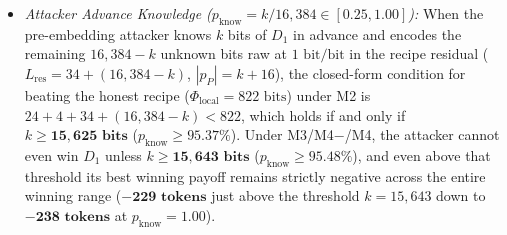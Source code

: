\documentclass[runningheads,a4paper]{llncs}
\renewcommand{\_}{\textunderscore\allowbreak}
\begin{document}
\begin{itemize}
  \item \emph{Attacker Advance Knowledge ($p_{\text{know}} = k / 16,384 \in [0.25,\allowbreak 1.00]$):} When the pre-embedding attacker knows $k$ bits of $D_1$ in advance and encodes the remaining $16,384 - k$ unknown bits raw at $1\text{ bit/bit}$ in the recipe residual ($L_{\text{res}} = 34 + (16,384 - k)$, $|p_P| = k + 16$), the closed-form condition for beating the honest recipe ($\Phi_{\text{local}} = 822\text{ bits}$) under M2 is $24 + 4 + 34 + (16,384 - k) < 822$, which holds if and only if $k \ge \mathbf{15,625\text{ bits}}$ ($p_{\text{know}} \ge \mathbf{95.37\%}$). Under M3/M4$-$/M4, the attacker cannot even win $D_1$ unless $k \ge \mathbf{15,643\text{ bits}}$ ($p_{\text{know}} \ge \mathbf{95.48\%}$), and even above that threshold its best winning payoff remains strictly negative across the entire winning range ($\mathbf{-229\text{ tokens}}$ just above the threshold $k = 15,643$ down to $\mathbf{-238\text{ tokens}}$ at $p_{\text{know}} = 1.00$).
\end{itemize}
\end{document}
